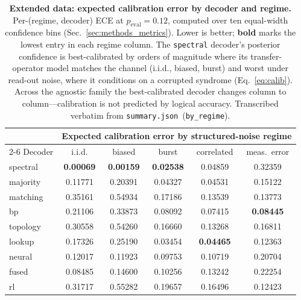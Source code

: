 \documentclass[reprint,aps,prxquantum,amsmath,amssymb,floatfix,nofootinbib,longbibliography]{revtex4-2}
\theoremstyle{definition}
\theoremstyle{remark}
\theoremstyle{plain}
\begin{document}
\begin{table}[tb]
    \centering
    \caption{\textbf{Extended data: expected calibration error by decoder and regime.} Per-(regime, decoder) ECE at $p_{\mathrm{eval}}=0.12$, computed over ten equal-width confidence bins (Sec.~\ref{sec:methods_metrics}). Lower is better; \textbf{bold} marks the lowest entry in each regime column. The \texttt{spectral} decoder's posterior confidence is best-calibrated by orders of magnitude where its transfer-operator model matches the channel (i.i.d., biased, burst) and worst under read-out noise, where it conditions on a corrupted syndrome (Eq.~\eqref{eq:calib}). Across the agnostic family the best-calibrated decoder changes column to column---calibration is not predicted by logical accuracy. Transcribed verbatim from \texttt{summary.json}~(\texttt{by\_regime}).}
    \label{tab:ed_ece}
\begin{tabular}{lccccc}
\toprule
 & \multicolumn{5}{c}{Expected calibration error by structured-noise regime} \\
\cmidrule(lr){2-6}
Decoder & i.i.d. & biased & burst & correlated & meas.\ error \\
\midrule
spectral  & \textbf{0.00069} & \textbf{0.00159} & \textbf{0.02538} & 0.04859 & 0.32359 \\
majority  & 0.11771 & 0.20391 & 0.04327 & 0.04531 & 0.15122 \\
matching  & 0.35161 & 0.54934 & 0.17186 & 0.13539 & 0.13773 \\
bp        & 0.21106 & 0.33873 & 0.08092 & 0.07415 & \textbf{0.08445} \\
topology  & 0.30558 & 0.54260 & 0.16660 & 0.13268 & 0.16811 \\
lookup    & 0.17326 & 0.25190 & 0.03454 & \textbf{0.04465} & 0.12363 \\
neural    & 0.12017 & 0.11923 & 0.09753 & 0.10719 & 0.20704 \\
fused     & 0.08485 & 0.14600 & 0.10256 & 0.13242 & 0.22254 \\
rl        & 0.31717 & 0.55282 & 0.19657 & 0.16496 & 0.12423 \\
\bottomrule
\end{tabular}
\end{table}
\end{document}
